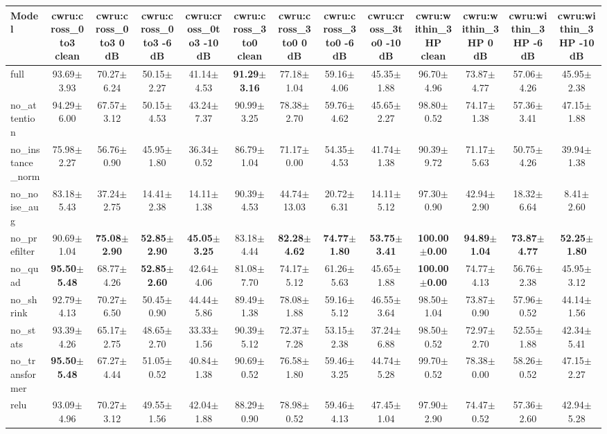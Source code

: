 \begin{tabular}{lcccccccccccc}
\toprule
Model & cwru:cross\_0to3 clean & cwru:cross\_0to3 0 dB & cwru:cross\_0to3 -6 dB & cwru:cross\_0to3 -10 dB & cwru:cross\_3to0 clean & cwru:cross\_3to0 0 dB & cwru:cross\_3to0 -6 dB & cwru:cross\_3to0 -10 dB & cwru:within\_3HP clean & cwru:within\_3HP 0 dB & cwru:within\_3HP -6 dB & cwru:within\_3HP -10 dB \\
\midrule
full & 93.69$\pm$3.93 & 70.27$\pm$6.24 & 50.15$\pm$2.27 & 41.14$\pm$4.53 & \textbf{91.29$\pm$3.16} & 77.18$\pm$1.04 & 59.16$\pm$4.06 & 45.35$\pm$1.88 & 96.70$\pm$4.96 & 73.87$\pm$4.77 & 57.06$\pm$4.26 & 45.95$\pm$2.38 \\
no\_attention & 94.29$\pm$6.00 & 67.57$\pm$3.12 & 50.15$\pm$4.53 & 43.24$\pm$7.37 & 90.99$\pm$3.25 & 78.38$\pm$2.70 & 59.76$\pm$4.62 & 45.65$\pm$2.27 & 98.80$\pm$0.52 & 74.17$\pm$1.38 & 57.36$\pm$3.41 & 47.15$\pm$1.88 \\
no\_instance\_norm & 75.98$\pm$2.27 & 56.76$\pm$0.90 & 45.95$\pm$1.80 & 36.34$\pm$0.52 & 86.79$\pm$1.04 & 71.17$\pm$0.00 & 54.35$\pm$4.53 & 41.74$\pm$1.38 & 90.39$\pm$9.72 & 71.17$\pm$5.63 & 50.75$\pm$4.26 & 39.94$\pm$1.38 \\
no\_noise\_aug & 83.18$\pm$5.43 & 37.24$\pm$2.75 & 14.41$\pm$2.38 & 14.11$\pm$1.38 & 90.39$\pm$4.53 & 44.74$\pm$13.03 & 20.72$\pm$6.31 & 14.11$\pm$5.12 & 97.30$\pm$0.90 & 42.94$\pm$2.90 & 18.32$\pm$6.64 & 8.41$\pm$2.60 \\
no\_prefilter & 90.69$\pm$1.04 & \textbf{75.08$\pm$2.90} & \textbf{52.85$\pm$2.90} & \textbf{45.05$\pm$3.25} & 83.18$\pm$4.44 & \textbf{82.28$\pm$4.62} & \textbf{74.77$\pm$1.80} & \textbf{53.75$\pm$3.41} & \textbf{100.00$\pm$0.00} & \textbf{94.89$\pm$1.04} & \textbf{73.87$\pm$4.77} & \textbf{52.25$\pm$1.80} \\
no\_quad & \textbf{95.50$\pm$5.48} & 68.77$\pm$4.26 & \textbf{52.85$\pm$2.60} & 42.64$\pm$4.06 & 81.08$\pm$7.70 & 74.17$\pm$5.12 & 61.26$\pm$5.63 & 45.65$\pm$1.88 & \textbf{100.00$\pm$0.00} & 74.77$\pm$4.13 & 56.76$\pm$2.38 & 45.95$\pm$3.12 \\
no\_shrink & 92.79$\pm$4.13 & 70.27$\pm$6.50 & 50.45$\pm$0.90 & 44.44$\pm$5.86 & 89.49$\pm$1.38 & 78.08$\pm$1.88 & 59.16$\pm$5.12 & 46.55$\pm$3.64 & 98.50$\pm$1.04 & 73.87$\pm$0.90 & 57.96$\pm$0.52 & 44.14$\pm$1.56 \\
no\_stats & 93.39$\pm$4.26 & 65.17$\pm$2.75 & 48.65$\pm$2.70 & 33.33$\pm$1.56 & 90.39$\pm$5.12 & 72.37$\pm$7.28 & 53.15$\pm$2.38 & 37.24$\pm$6.88 & 98.50$\pm$0.52 & 72.97$\pm$2.70 & 52.55$\pm$1.88 & 42.34$\pm$5.41 \\
no\_transformer & \textbf{95.50$\pm$5.48} & 67.27$\pm$4.44 & 51.05$\pm$0.52 & 40.84$\pm$1.38 & 90.69$\pm$0.52 & 76.58$\pm$1.80 & 59.46$\pm$3.25 & 44.74$\pm$5.28 & 99.70$\pm$0.52 & 78.38$\pm$0.00 & 58.26$\pm$0.52 & 47.15$\pm$2.27 \\
relu & 93.09$\pm$4.96 & 70.27$\pm$3.12 & 49.55$\pm$1.56 & 42.04$\pm$1.88 & 88.29$\pm$0.90 & 78.98$\pm$0.52 & 59.46$\pm$4.13 & 47.45$\pm$1.04 & 97.90$\pm$2.90 & 74.47$\pm$0.52 & 57.36$\pm$2.60 & 42.94$\pm$5.28 \\
\bottomrule
\end{tabular}

